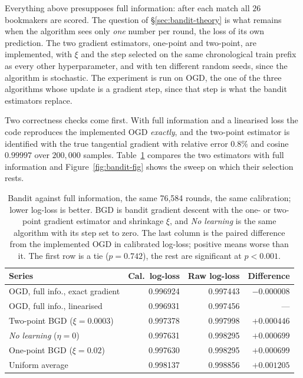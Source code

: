 \documentclass[12pt,a4paper,oneside]{report}
\renewcommand{\_}{\oldunderscore\allowbreak}
\theoremstyle{definition}
\theoremstyle{plain}
\theoremstyle{definition}   %
\begin{document}
Everything above presupposes full information: after each match all $26$ bookmakers are scored.
The question of \S\ref{sec:bandit-theory} is what remains when the algorithm sees only \emph{one}
number per round, the loss of its own prediction. The two gradient estimators, one-point and
two-point, are implemented, with $\xi$ and the step selected on the same chronological train
prefix as every other hyperparameter, and with ten different random seeds, since the algorithm is
stochastic. The experiment is run on OGD, the one of the three algorithms whose update is a
gradient step, since that step is what the bandit estimators replace.

Two correctness checks come first. With full information and a linearised loss the code
reproduces the implemented OGD \emph{exactly}, and the two-point estimator is identified with the
true tangential gradient with relative error $0.8\%$ and cosine $0.99997$ over $200{,}000$
samples. Table~\ref{tab:bandit} compares the two estimators with full information and
Figure~\ref{fig:bandit-fig} shows the sweep on which their selection rests.

\begin{table}[H]
\centering
\small
\begin{tabular}{lrrr}
\toprule
Series & Cal.\ log-loss & Raw log-loss & Difference \\
\midrule
OGD, full info., exact gradient & 0.996924 & 0.997443 & $-0.000008$ \\
OGD, full info., linearised & 0.996931 & 0.997456 & --- \\
Two-point BGD ($\xi=0.0003$) & 0.997378 & 0.997998 & $+0.000446$ \\
\emph{No learning} ($\eta=0$) & 0.997631 & 0.998295 & $+0.000699$ \\
One-point BGD ($\xi=0.02$) & 0.997630 & 0.998295 & $+0.000699$ \\
Uniform average & 0.998137 & 0.998856 & $+0.001205$ \\
\bottomrule
\end{tabular}
\caption{Bandit against full information, the same 76,584 rounds, the same calibration; lower
log-loss is better. BGD is bandit gradient descent with the one- or two-point gradient estimator
and shrinkage $\xi$, and \emph{No learning} is the same algorithm with its step set to zero. The last
column is the paired difference from the implemented OGD in calibrated log-loss; positive means
worse than it. The first row is a tie ($p=0.742$), the rest are significant at $p<0.001$.}
\label{tab:bandit}
\end{table}
\end{document}
